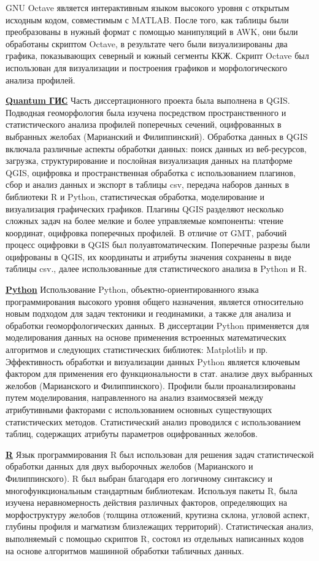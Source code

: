 GNU Octave является интерактивным языком высокого уровня с открытым исходным кодом, совместимым с MATLAB. После того, как таблицы были преобразованы в нужный формат с помощью манипуляций в AWK, они были обработаны скриптом Octave, в результате чего были визуализированы два графика, показывающих северный и южный сегменты ККЖ. Скрипт Octave был использован для визуализации и построения графиков и морфологического анализа профилей.

\underline{\textbf{Quantum ГИС}} 
Часть диссертационного проекта была выполнена в QGIS. Подводная геоморфология была изучена посредством пространственного и статистического анализа профилей поперечных сечений, оцифрованных в выбранных желобах (Марианский и Филиппинский). Обработка данных в QGIS включала различные аспекты обработки данных: поиск данных из веб-ресурсов, загрузка, структурирование и послойная визуализация данных на платформе QGIS, оцифровка и пространственная обработка с использованием плагинов, сбор и анализ данных и экспорт в таблицы csv, передача наборов данных в библиотеки R и Python, статистическая обработка, моделирование и визуализация графических графиков. Плагины QGIS разделяют несколько сложных задач на более мелкие и более управляемые компоненты: чтение координат, оцифровка поперечных профилей. В отличие от GMT, рабочий процесс оцифровки в QGIS был полуавтоматическим. Поперечные разрезы были оцифрованы в QGIS, их координаты и атрибуты значения сохранены в виде таблицы csv., далее использованные для статистического анализа в Python и R. 

\underline{\textbf{Python}} 
Использование Python, объектно-ориентированного языка программирования высокого уровня общего назначения, является относительно новым подходом для задач тектоники и геодинамики, а также для анализа и обработки геоморфологических данных. В диссертации Python применяется для моделирования данных на основе применения встроенных математических алгоритмов и следующих статистических библиотек: Matplotlib и пр. Эффективность обработки и визуализации данных Python является ключевым фактором для применения его функциональности в стат. анализе двух выбранных желобов (Марианского и Филиппинского). Профили были проанализированы путем моделирования, направленного на анализ взаимосвязей между атрибутивными факторами с использованием основных существующих статистических методов. Статистический анализ проводился с использованием таблиц, содержащих атрибуты параметров оцифрованных желобов. 
	
\underline{\textbf{R}} 
Язык программирования R был использован для решения задач статистической обработки данных для двух выборочных желобов (Марианского и Филиппинского). R был выбран благодаря его логичному синтаксису и многофункциональным стандартным библиотекам. Используя пакеты R, была изучена неравномерность действия различных факторов, определяющих на морфоструктуру желобов (толщина отложений, крутизна склона, угловой аспект, глубины профиля и магматизм близлежащих территорий). Статистическая анализ, выполняемый с помощью скриптов R, состоял из отдельных написанных кодов на основе алгоритмов машинной обработки табличных данных. 

